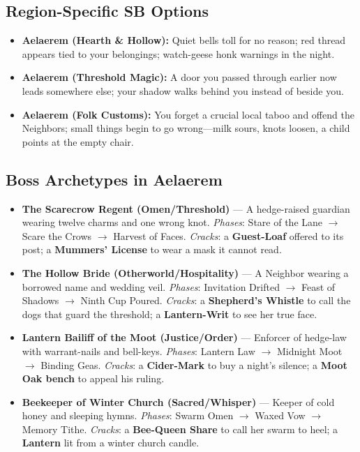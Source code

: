\subsection*{Region-Specific SB Options}
\begin{itemize}
\item \textbf{Aelaerem (Hearth \& Hollow):} Quiet bells toll for no reason; red thread appears tied to your belongings; watch-geese honk warnings in the night.
\item \textbf{Aelaerem (Threshold Magic):} A door you passed through earlier now leads somewhere else; your shadow walks behind you instead of beside you.
\item \textbf{Aelaerem (Folk Customs):} You forget a crucial local taboo and offend the Neighbors; small things begin to go wrong---milk sours, knots loosen, a child points at the empty chair.
\end{itemize}

\subsection*{Boss Archetypes in Aelaerem}
\label{sec:aelaerem-bosses}
\begin{itemize}
\item \textbf{The Scarecrow Regent (Omen/Threshold)} --- A hedge-raised guardian wearing twelve charms and one wrong knot. \emph{Phases}: Stare of the Lane $\rightarrow$ Scare the Crows $\rightarrow$ Harvest of Faces. \emph{Cracks}: a \textbf{Guest-Loaf} offered to its post; a \textbf{Mummers' License} to wear a mask it cannot read.
\item \textbf{The Hollow Bride (Otherworld/Hospitality)} --- A Neighbor wearing a borrowed name and wedding veil. \emph{Phases}: Invitation Drifted $\rightarrow$ Feast of Shadows $\rightarrow$ Ninth Cup Poured. \emph{Cracks}: a \textbf{Shepherd's Whistle} to call the dogs that guard the threshold; a \textbf{Lantern-Writ} to see her true face.
\item \textbf{Lantern Bailiff of the Moot (Justice/Order)} --- Enforcer of hedge-law with warrant-nails and bell-keys. \emph{Phases}: Lantern Law $\rightarrow$ Midnight Moot $\rightarrow$ Binding Geas. \emph{Cracks}: a \textbf{Cider-Mark} to buy a night's silence; a \textbf{Moot Oak bench} to appeal his ruling.
\item \textbf{Beekeeper of Winter Church (Sacred/Whisper)} --- Keeper of cold honey and sleeping hymns. \emph{Phases}: Swarm Omen $\rightarrow$ Waxed Vow $\rightarrow$ Memory Tithe. \emph{Cracks}: a \textbf{Bee-Queen Share} to call her swarm to heel; a \textbf{Lantern} lit from a winter church candle.
\end{itemize}

